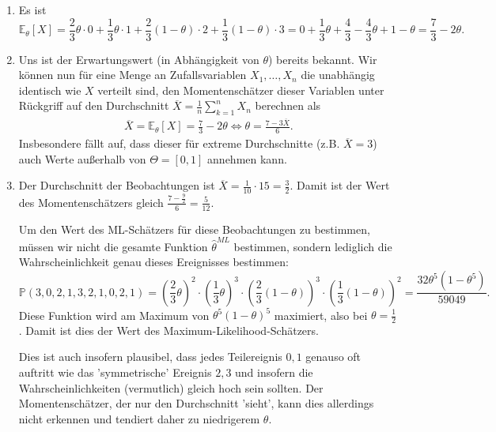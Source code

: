 \documentclass[a4paper]{article}
\begin{document}
\begin{enumerate}
    \item Es ist 
    \begin{equation*}
        \mathds{E}_\theta[X] = \frac{2}{3} \theta \cdot 0 + \frac{1}{3} \theta \cdot 1 + \frac{2}{3} ( 1- \theta) \cdot 2 + \frac{1}{3} (1-\theta) \cdot 3 = 0 + \frac{1}{3} \theta + \frac{4}{3} - \frac{4}{3} \theta + 1 - \theta = \frac{7}{3} - 2 \theta\text{.}
    \end{equation*}
    \item Uns ist der Erwartungswert (in Abhängigkeit von $\theta$) bereits bekannt.
    Wir können nun für eine Menge an Zufallsvariablen $X_1, \dots, X_n$ die unabhängig identisch wie $X$ verteilt sind, den Momentenschätzer dieser Variablen unter Rückgriff auf den Durchschnitt $\overline{X} = \frac{1}{n}\sum_{k = 1}^{n} X_n$ berechnen als
    \begin{align*}
        \overline{X} = \mathds{E}_\theta[X] = \frac{7}{3} - 2 \theta \iff \theta = \frac{7 - 3 \overline{X}}{6}\text{.}
    \end{align*}
    Insbesondere fällt auf, dass dieser für extreme Durchschnitte (z.B. $\overline{X} = 3$) auch Werte außerhalb von $\Theta = [0,1]$ annehmen kann.
    \item Der Durchschnitt der Beobachtungen ist $\overline{X} = \frac{1}{10} \cdot 15 = \frac{3}{2}$. Damit ist der Wert des Momentenschätzers gleich $\frac{7 - \frac{9}{2}}{6} = \frac{5}{12}$.
    
    Um den Wert des ML-Schätzers für diese Beobachtungen zu bestimmen, müssen wir nicht die gesamte Funktion $\hat{\theta}^{ML}$ bestimmen, sondern lediglich die Wahrscheinlichkeit genau dieses Ereignisses bestimmen:
    \begin{equation*}
        \mathds{P}(3,0,2,1,3,2,1,0,2,1) = \left(\frac{2}{3}\theta\right)^2 \cdot \left(\frac{1}{3} \theta\right)^3 \cdot \left(\frac{2}{3}(1-\theta)\right)^3 \cdot \left(\frac{1}{3}(1-\theta)\right)^2 = \frac{32 \theta^5 (1-\theta^5)}{59049}\text{.}
    \end{equation*}
    Diese Funktion wird am Maximum von $\theta^5 (1-\theta)^5$ maximiert, also bei $\theta = \frac{1}{2}$.
    Damit ist dies der Wert des Maximum-Likelihood-Schätzers.

    Dies ist auch insofern plausibel, dass jedes Teilereignis $0,1$ genauso oft auftritt wie das 'symmetrische' Ereignis $2,3$ und insofern die Wahrscheinlichkeiten (vermutlich) gleich hoch sein sollten.
    Der Momentenschätzer, der nur den Durchschnitt 'sieht', kann dies allerdings nicht erkennen und tendiert daher zu niedrigerem $\theta$.
\end{enumerate} 

\subsection{}
\end{document}
